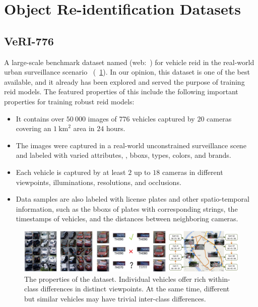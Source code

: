 \section{Object Re-identification Datasets}
\label{sec:ObjectReIDDatasets}

\subsection{VeRI-776}
\label{ssec:DatasetVeRI776}

A large-scale benchmark dataset named \verisss{} (web:~\cite{webveridataset}) for vehicle \gls{reid} in the real-world urban surveillance scenario~\cite{liu2018provid} (\figtext{}~\ref{fig:VeRI776Dataset}). In our opinion, this dataset is one of the best available, and it already has been explored and served the purpose of training \gls{reid} models. The featured properties of this include the following important properties for training robust \gls{reid} models:

\begin{itemize}
    \item It contains over $50\ 000$ images of $776$ vehicles captured by $20$ cameras covering an $1\  \text{km}^2$ area in $24$ hours.
    \item The images were captured in a real-world unconstrained surveillance scene and labeled with varied attributes, \egtext{}, \glspl{bbox}, types, colors, and brands.
    \item Each vehicle is captured by at least $2$ up to $18$ cameras in different viewpoints, illuminations, resolutions, and occlusions.
    \item Data samples are also labeled with license plates and other spatio-temporal information, such as the \glspl{bbox} of plates with corresponding strings, the timestamps of vehicles, and the distances between neighboring cameras.
\end{itemize}

\begin{figure}[t]
    \centerline{\includegraphics[width=\linewidth]{figures/datasets/veri776__overview.pdf}}
    \caption[\verisss{} dataset]{The properties of the \verisss{} dataset. Individual vehicles offer rich within-class differences in distinct viewpoints. At the same time, different but similar vehicles may have trivial inter-class differences. }
    \label{fig:VeRI776Dataset}
\end{figure}
